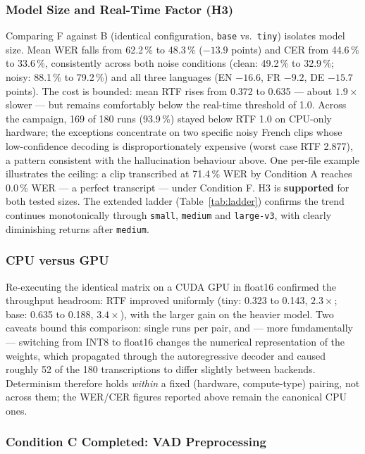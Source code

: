 \documentclass[12pt]{report}
\begin{document}
\subsubsection{Model Size and Real-Time Factor (H3)}

Comparing F against B (identical configuration, \texttt{base} vs.\ \texttt{tiny}) isolates model size. Mean WER falls from 62.2\,\% to 48.3\,\% ($-13.9$ points) and CER from 44.6\,\% to 33.6\,\%, consistently across both noise conditions (clean: 49.2\,\% to 32.9\,\%; noisy: 88.1\,\% to 79.2\,\%) and all three languages (EN $-16.6$, FR $-9.2$, DE $-15.7$ points). The cost is bounded: mean RTF rises from 0.372 to 0.635 --- about $1.9\times$ slower --- but remains comfortably below the real-time threshold of 1.0. Across the campaign, 169 of 180 runs (93.9\,\%) stayed below RTF 1.0 on CPU-only hardware; the exceptions concentrate on two specific noisy French clips whose low-confidence decoding is disproportionately expensive (worst case RTF 2.877), a pattern consistent with the hallucination behaviour above. One per-file example illustrates the ceiling: a clip transcribed at 71.4\,\% WER by Condition A reaches 0.0\,\% WER --- a perfect transcript --- under Condition F. H3 is \textbf{supported} for both tested sizes. The extended ladder (Table~\ref{tab:ladder}) confirms the trend continues monotonically through \texttt{small}, \texttt{medium} and \texttt{large-v3}, with clearly diminishing returns after \texttt{medium}.

\subsubsection{CPU versus GPU}

Re-executing the identical matrix on a CUDA GPU in float16 confirmed the throughput headroom: RTF improved uniformly (tiny: 0.323 to 0.143, $2.3\times$; base: 0.635 to 0.188, $3.4\times$), with the larger gain on the heavier model. Two caveats bound this comparison: single runs per pair, and --- more fundamentally --- switching from INT8 to float16 changes the numerical representation of the weights, which propagated through the autoregressive decoder and caused roughly 52 of the 180 transcriptions to differ slightly between backends. Determinism therefore holds \emph{within} a fixed (hardware, compute-type) pairing, not across them; the WER/CER figures reported above remain the canonical CPU ones.

\subsubsection{Condition C Completed: VAD Preprocessing}
\end{document}
